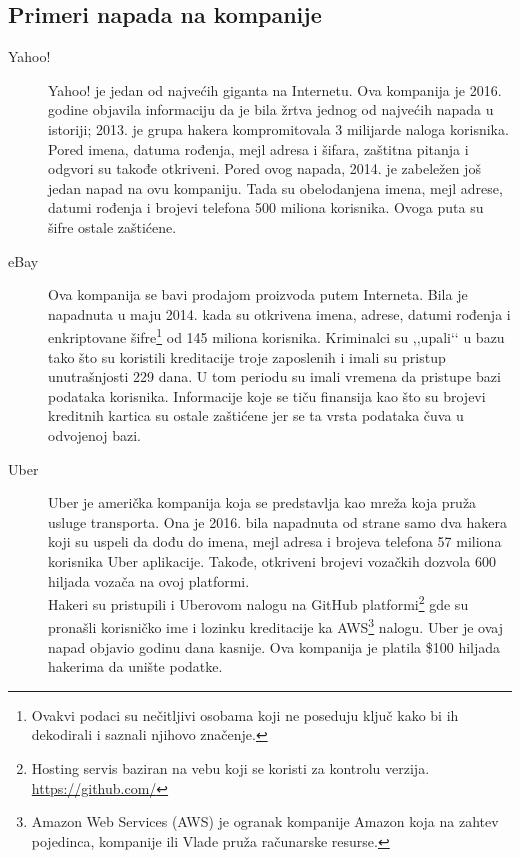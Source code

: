 \documentclass[a4paper]{article}
\theoremstyle{break}
\begin{document}
{\begin{description}
\end{description}


\subsection{Primeri napada na kompanije}
\label{subsec:primeri_napada_kompanije}


\begin{description}
\item [Yahoo!] Yahoo! je jedan od najvećih giganta na Internetu. Ova kompanija je 2016. godine objavila informaciju da je bila žrtva jednog od najvećih napada u istoriji; 2013. je grupa hakera kompromitovala 3 milijarde naloga korisnika. Pored imena, datuma rođenja, mejl adresa i šifara, zaštitna pitanja i odgvori su takođe otkriveni. 
Pored ovog napada, 2014. je zabeležen još jedan napad na ovu kompaniju. Tada su obelodanjena imena, mejl adrese, datumi rođenja i brojevi telefona 500 miliona korisnika. Ovoga puta su šifre ostale zaštićene. 
\item [eBay] Ova kompanija se bavi prodajom proizvoda putem Interneta. Bila je napadnuta u maju 2014. kada su otkrivena imena, adrese, datumi rođenja i enkriptovane šifre\footnote{Ovakvi podaci su nečitljivi osobama koji ne poseduju ključ kako bi ih dekodirali i saznali njihovo značenje.} od 145 miliona korisnika. Kriminalci su ,,upali‘‘ u bazu tako što su koristili kreditacije troje zaposlenih i imali su pristup unutrašnjosti 229 dana. U tom periodu su imali vremena da pristupe bazi podataka korisnika. Informacije koje se tiču finansija kao što su brojevi kreditnih kartica su ostale zaštićene jer se ta vrsta podataka čuva u odvojenoj bazi.
\item [Uber] Uber je američka kompanija koja se predstavlja kao mreža koja pruža usluge transporta. Ona je 2016. bila napadnuta od strane samo dva hakera koji su uspeli da dođu do imena, mejl adresa i brojeva telefona 57 miliona korisnika Uber aplikacije. Takođe, otkriveni brojevi vozačkih dozvola 600 hiljada vozača na ovoj platformi.\\Hakeri su pristupili i Uberovom nalogu na GitHub platformi\footnote{Hosting servis baziran na vebu koji se koristi za kontrolu verzija. \url{https://github.com/}} gde su pronašli korisničko ime i lozinku kreditacije ka AWS\footnote{Amazon Web Services (AWS) je ogranak kompanije Amazon koja na zahtev pojedinca, kompanije ili Vlade pruža računarske resurse.} nalogu. 
Uber je ovaj napad objavio godinu dana kasnije. Ova kompanija je platila \$100 hiljada hakerima da unište podatke.  
\end{description}


}
\end{document}
